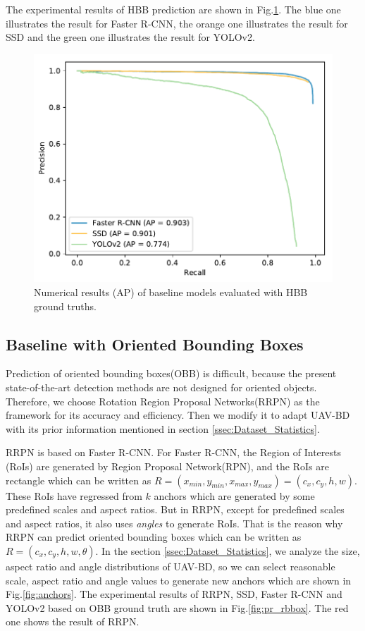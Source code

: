 The experimental results of HBB prediction are shown in Fig.\ref{fig:pr_bbox}. The blue one illustrates the result for Faster R-CNN, the orange one illustrates the result for SSD and the green one illustrates the result for YOLOv2.


\begin{figure}
	\includegraphics[width=\linewidth]{images/pr_bbox.pdf}
	\caption{Numerical results (AP) of baseline models evaluated with HBB ground truths.}
	\label{fig:pr_bbox}
\end{figure}

\subsection{Baseline with Oriented Bounding Boxes}

Prediction of oriented bounding boxes(OBB) is difficult, because the present state-of-the-art detection methods are not designed for oriented objects. Therefore, we choose Rotation Region Proposal Networks(RRPN)\cite{RRPN} as the framework for its accuracy and efficiency. Then we modify it to adapt UAV-BD with its prior information mentioned in section \ref{ssec:Dataset_Statistics}.

RRPN is based on Faster R-CNN. For Faster R-CNN, the Region of Interests (RoIs) are generated by Region Proposal Network(RPN), and the RoIs are rectangle which can be written as $ R = (x_{min}, y_{min}, x_{max}, y_{max}) = (c_x, c_y, h, w) $. These RoIs have regressed from $ k $ anchors which are generated by some predefined scales and aspect ratios. But in RRPN, except for predefined scales and aspect ratios, it also uses \textit{angles} to generate RoIs. That is the reason why RRPN can predict oriented bounding boxes which can be written as $ R=(c_x, c_y, h, w, \theta) $. In the section \ref{ssec:Dataset_Statistics}, we analyze the size, aspect ratio and angle distributions of UAV-BD, so we can select reasonable scale, aspect ratio and angle values to generate new anchors which are shown in Fig.\ref{fig:anchors}. The experimental results of RRPN, SSD, Faster R-CNN and YOLOv2 based on OBB ground truth are shown in Fig.\ref{fig:pr_rbbox}. The red one shows the result of RRPN.




